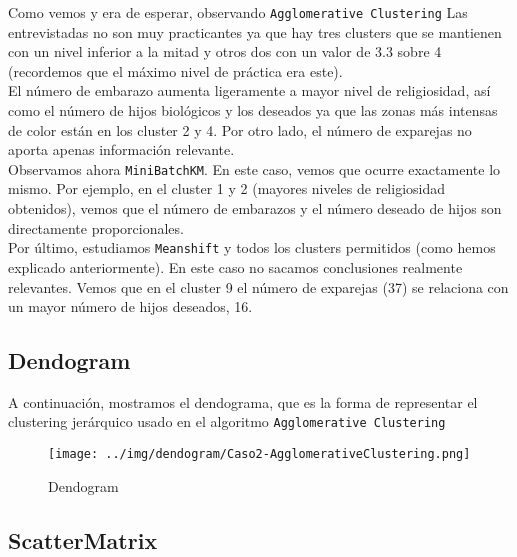 	
	\begin{figure}[H]
		\centering
		
	\end{figure}

	Como vemos y era de esperar, observando \texttt{Agglomerative Clustering} Las entrevistadas no son muy practicantes ya que hay tres clusters que se mantienen con un nivel inferior a la mitad y otros dos con un valor de 3.3 sobre 4 (recordemos que el máximo nivel de práctica era este). \\ 
	
	
	El número de embarazo aumenta ligeramente a mayor nivel de religiosidad, así como el número de hijos biológicos y los deseados ya que las zonas más intensas de color están en los cluster 2 y 4. 
	Por otro lado, el número de exparejas no aporta apenas información relevante. \\
	
	Observamos ahora \texttt{MiniBatchKM}. En este caso, vemos que ocurre exactamente lo mismo. Por ejemplo, en el cluster 1 y 2 (mayores niveles de religiosidad obtenidos), vemos que el número de embarazos y el número deseado de hijos son directamente proporcionales. \\
	
	Por último, estudiamos \texttt{Meanshift} y todos los clusters permitidos (como hemos explicado anteriormente).
	En este caso no sacamos conclusiones realmente relevantes. Vemos que en el cluster 9 el número de exparejas (37) se relaciona con un mayor número de hijos deseados, 16. 

	\subsection{Dendogram}
	
	A continuación, mostramos el dendograma, que es la forma de representar el clustering jerárquico usado en el algoritmo \texttt{Agglomerative Clustering}
	
	\begin{figure}[H]
		\centering
		\texttt{[image: ../img/dendogram/Caso2-AgglomerativeClustering.png]}
		
		\caption{Dendogram}
	\end{figure}





	\newpage
	\subsection{ScatterMatrix}
	
